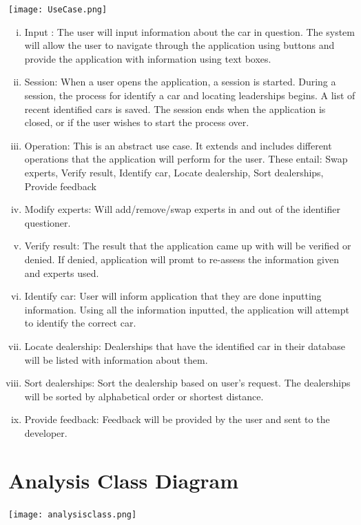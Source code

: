 \documentclass[12pt]{article}
\begin{document}
	\texttt{[image: UseCase.png]}
	\begin{enumerate}[i)]
	\item Input : The user will input information about the car in question. The system will allow the user to navigate through the application using buttons and provide the application with information using text boxes.

	\item Session: When a user opens the application, a session is started. During a session, the process for identify a car and locating leaderships begins. A list of recent identified cars is saved. The session ends when the application is closed, or if the user wishes to start the process over.

	\item Operation: This is an abstract use case. It extends and includes different operations that the application will perform for the user. These entail: Swap experts, Verify result, Identify car, Locate dealership, Sort dealerships, Provide feedback

	\item Modify experts: Will add/remove/swap experts in and out of the identifier questioner.

	\item Verify result: The result that the application came up with will be verified or denied. If denied, application will promt to re-assess the information given and experts used.

	\item Identify car: User will inform application that they are done inputting information. Using all the information inputted, the application will attempt to identify the correct car.

	\item Locate dealership: Dealerships that have the identified car in their database will be listed with information about them.

	\item Sort dealerships: Sort the dealership based on user's request. The dealerships will be sorted by alphabetical order or shortest distance.

	\item Provide feedback: Feedback will be provided by the user and sent to the developer.

	\end{enumerate}

\section{Analysis Class Diagram}
\label{sec:analysis_class_diagram}
\texttt{[image: analysisclass.png]}
\end{document}
